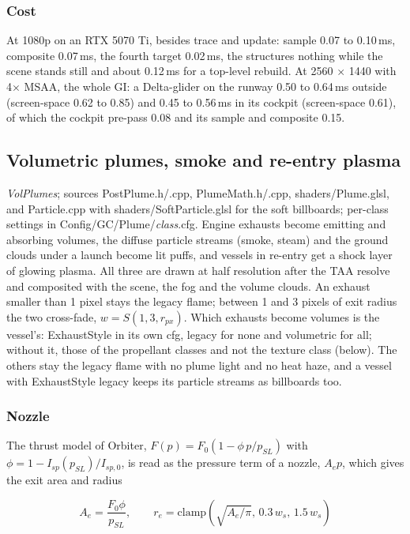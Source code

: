 \documentclass[Orbiter Technical Reference.tex]{subfiles}
\begin{document}
\begin{sloppypar}
\subsubsection{Cost}
At 1080p on an RTX 5070 Ti, besides trace and update: sample 0.07 to 0.10\,ms, composite 0.07\,ms, the fourth target 0.02\,ms, the structures nothing while the scene stands still and about 0.12\,ms for a top-level rebuild. At 2560 $\times$ 1440 with 4$\times$ MSAA, the whole GI: a Delta-glider on the runway 0.50 to 0.64\,ms outside (screen-space 0.62 to 0.85) and 0.45 to 0.56\,ms in its cockpit (screen-space 0.61), of which the cockpit pre-pass 0.08 and its sample and composite 0.15.

\subsection{Volumetric plumes, smoke and re-entry plasma}\label{sec:vk_plume}
\textit{VolPlumes}; sources PostPlume.h/.cpp, PlumeMath.h/.cpp, shaders/Plume.glsl, and Particle.cpp with shaders/SoftParticle.glsl for the soft billboards; per-class settings in Config/GC/Plume/\textit{class}.cfg. Engine exhausts become emitting and absorbing volumes, the diffuse particle streams (smoke, steam) and the ground clouds under a launch become lit puffs, and vessels in re-entry get a shock layer of glowing plasma. All three are drawn at half resolution after the TAA resolve and composited with the scene, the fog and the volume clouds. An exhaust smaller than 1 pixel stays the legacy flame; between 1 and 3 pixels of exit radius the two cross-fade, $w = S(1, 3, r_{px})$. Which exhausts become volumes is the vessel's: ExhaustStyle in its own cfg, legacy for none and volumetric for all; without it, those of the propellant classes and not the texture class (below). The others stay the legacy flame with no plume light and no heat haze, and a vessel with ExhaustStyle legacy keeps its particle streams as billboards too.

\subsubsection{Nozzle}
The thrust model of Orbiter, $F(p) = F_{0}(1 - \phi\,p/p_{SL})$ with $\phi = 1 - I_{sp}(p_{SL})/I_{sp,0}$, is read as the pressure term of a nozzle, $A_{e}p$, which gives the exit area and radius

\[ A_{e} = \frac{F_{0}\phi}{p_{SL}}, \qquad r_{e} = \mathrm{clamp}\left(\sqrt{A_{e}/\pi},\, 0.3\,w_{s},\, 1.5\,w_{s}\right) \]


\end{sloppypar}
\end{document}
